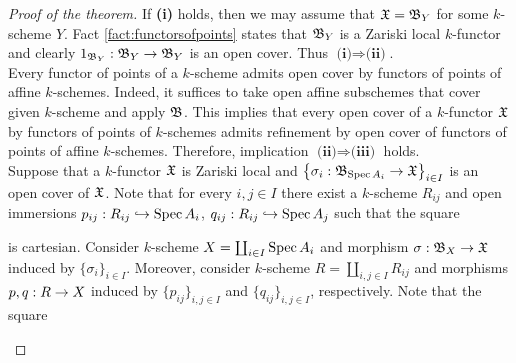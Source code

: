 \begin{proof}[Proof of the theorem]
If \textbf{(i)} holds, then we may assume that ${\mathfrak X}={\mathfrak B}_Y$ for some $k$-scheme $Y$. Fact \ref{fact:functorsofpoints} states that ${\mathfrak B}_Y$ is a Zariski local $k$-functor and clearly $1_{{\mathfrak B}_Y}:{\mathfrak B}_Y\rightarrow {\mathfrak B}_Y$ is an open cover. Thus $\textbf{(i)}\Rightarrow \textbf{(ii)}$.\\
Every functor of points of a $k$-scheme admits open cover by functors of points of affine $k$-schemes. Indeed, it suffices to take open affine subschemes that cover given $k$-scheme and apply ${\mathfrak B}$. This implies that every open cover of a $k$-functor ${\mathfrak X}$ by functors of points of $k$-schemes admits refinement by open cover of functors of points of affine $k$-schemes. Therefore, implication $\textbf{(ii)}\Rightarrow \textbf{(iii)}$ holds.\\
Suppose that a $k$-functor ${\mathfrak X}$ is Zariski local and $\big\{\sigma_i:{\mathfrak B}_{\mathrm{Spec}\, A_i}\rightarrow {\mathfrak X}\big\}_{i\in I}$ is an open cover of ${\mathfrak X}$. Note that for every $i,j\in I$ there exist a $k$-scheme $R_{ij}$ and open immersions $p_{ij}:R_{ij}\hookrightarrow \mathrm{Spec}\, A_i$, $q_{ij}:R_{ij}\hookrightarrow \mathrm{Spec}\, A_j$ such that the square
\begin{center}
\end{center}
is cartesian. Consider $k$-scheme $X = \coprod_{i\in I}\mathrm{Spec}\, A_i$ and morphism $\sigma:{\mathfrak B}_X\rightarrow {\mathfrak X}$ induced by $\{\sigma_i\}_{i\in I}$. Moreover, consider $k$-scheme $R = \coprod_{i,j\in I}R_{ij}$ and morphisms $p,q:R\rightarrow X$ induced by $\{p_{ij}\}_{i,j\in I}$ and $\{q_{ij}\}_{i,j\in I}$, respectively. Note that the square
\begin{center}
\end{center}
\end{proof}
